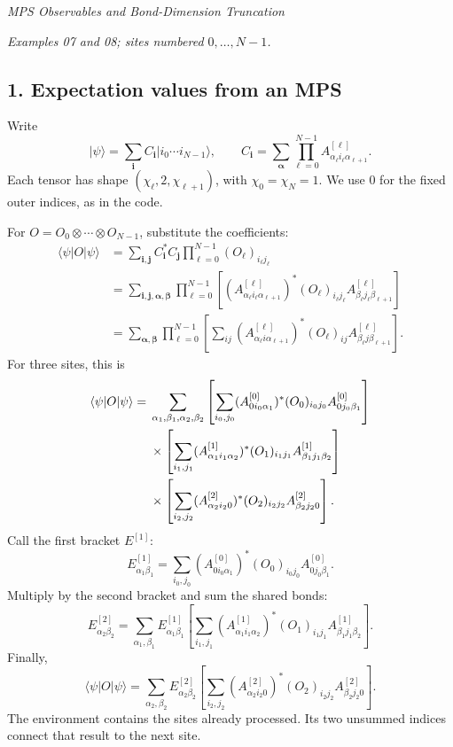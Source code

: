 \documentclass[11pt]{article}
\newcommand{\ket}[1]{\lvert #1\rangle}
\newcommand{\bra}[1]{\langle #1\rvert}
\newcommand{\heading}[1]{\begin{center}\large\textit{#1}\end{center}}
\begin{document}
\heading{MPS Observables and Bond-Dimension Truncation}
\textit{Examples 07 and 08; sites numbered $0,\ldots,N-1$.}

\subsection*{1. Expectation values from an MPS}
Write
\begin{equation}
\ket\psi=\sum_{\boldsymbol i}C_{\boldsymbol i}\ket{i_0\cdots i_{N-1}},
\qquad C_{\boldsymbol i}=\sum_{\boldsymbol\alpha}
\prod_{\ell=0}^{N-1}A^{[\ell]}_{\alpha_\ell i_\ell\alpha_{\ell+1}}.
\end{equation}
Each tensor has shape $(\chi_\ell,2,\chi_{\ell+1})$, with $\chi_0=\chi_N=1$. We use $0$ for the fixed outer indices, as in the code.

For $O=O_0\otimes\cdots\otimes O_{N-1}$, substitute the coefficients:
\begin{align}
\bra\psi O\ket\psi
&=\sum_{\boldsymbol i,\boldsymbol j}C_{\boldsymbol i}^*C_{\boldsymbol j}
\prod_{\ell=0}^{N-1}(O_\ell)_{i_\ell j_\ell}\\
&=\sum_{\boldsymbol i,\boldsymbol j,\boldsymbol\alpha,\boldsymbol\beta}
\prod_{\ell=0}^{N-1}\left[(A^{[\ell]}_{\alpha_\ell i_\ell\alpha_{\ell+1}})^*
(O_\ell)_{i_\ell j_\ell}A^{[\ell]}_{\beta_\ell j_\ell\beta_{\ell+1}}\right]\\
&=\sum_{\boldsymbol\alpha,\boldsymbol\beta}\prod_{\ell=0}^{N-1}
\left[\sum_{ij}(A^{[\ell]}_{\alpha_\ell i\alpha_{\ell+1}})^*
(O_\ell)_{ij}A^{[\ell]}_{\beta_\ell j\beta_{\ell+1}}\right].
\end{align}
For three sites, this is
\begin{align}
\bra\psi O\ket\psi={}&\sum_{\alpha_1,\beta_1,\alpha_2,\beta_2}
\left[\sum_{i_0,j_0}(A^{[0]}_{0i_0\alpha_1})^*
(O_0)_{i_0j_0}A^{[0]}_{0j_0\beta_1}\right]\notag\\
&\times\left[\sum_{i_1,j_1}(A^{[1]}_{\alpha_1i_1\alpha_2})^*
(O_1)_{i_1j_1}A^{[1]}_{\beta_1j_1\beta_2}\right]\notag\\
&\times\left[\sum_{i_2,j_2}(A^{[2]}_{\alpha_2i_2 0})^*
(O_2)_{i_2j_2}A^{[2]}_{\beta_2j_2 0}\right].
\end{align}
Call the first bracket $E^{[1]}$:
\begin{equation}
E^{[1]}_{\alpha_1\beta_1}
=\sum_{i_0,j_0}(A^{[0]}_{0i_0\alpha_1})^*(O_0)_{i_0j_0}A^{[0]}_{0j_0\beta_1}.
\end{equation}
Multiply by the second bracket and sum the shared bonds:
\begin{equation}
E^{[2]}_{\alpha_2\beta_2}=\sum_{\alpha_1,\beta_1}E^{[1]}_{\alpha_1\beta_1}
\left[\sum_{i_1,j_1}(A^{[1]}_{\alpha_1i_1\alpha_2})^*
(O_1)_{i_1j_1}A^{[1]}_{\beta_1j_1\beta_2}\right].
\end{equation}
Finally,
\begin{equation}
\bra\psi O\ket\psi=\sum_{\alpha_2,\beta_2}E^{[2]}_{\alpha_2\beta_2}
\left[\sum_{i_2,j_2}(A^{[2]}_{\alpha_2i_2 0})^*
(O_2)_{i_2j_2}A^{[2]}_{\beta_2j_2 0}\right].
\end{equation}
The environment contains the sites already processed. Its two unsummed indices connect that result to the next site.
\end{document}
